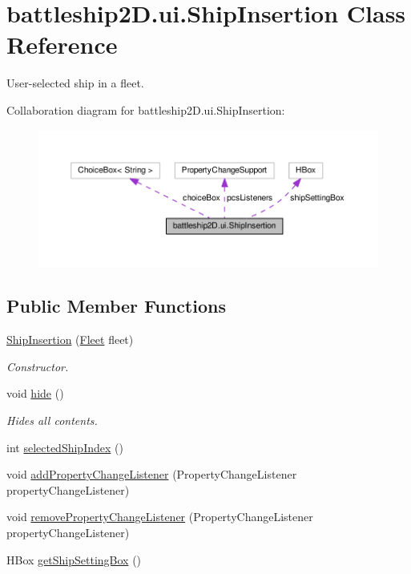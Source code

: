 \hypertarget{classbattleship2D_1_1ui_1_1ShipInsertion}{\section{battleship2\-D.\-ui.\-Ship\-Insertion Class Reference}
\label{classbattleship2D_1_1ui_1_1ShipInsertion}
}


User-\/selected ship in a fleet.  




Collaboration diagram for battleship2\-D.\-ui.\-Ship\-Insertion\-:\nopagebreak
\begin{figure}[H]
\begin{center}
\leavevmode
\includegraphics[width=350pt]{classbattleship2D_1_1ui_1_1ShipInsertion__coll__graph}
\end{center}
\end{figure}
\subsection*{Public Member Functions}
\begin{DoxyCompactItemize}
\item 
\hyperlink{classbattleship2D_1_1ui_1_1ShipInsertion_a834d63089b081bcbf9f1952e7d6de4eb}{Ship\-Insertion} (\hyperlink{classbattleship2D_1_1model_1_1Fleet}{Fleet} fleet)
\begin{DoxyCompactList}\small\item\em Constructor. \end{DoxyCompactList}\item 
void \hyperlink{classbattleship2D_1_1ui_1_1ShipInsertion_a50ceb5ee8c60826eeb3bbb581e692f6e}{hide} ()
\begin{DoxyCompactList}\small\item\em Hides all contents. \end{DoxyCompactList}\item 
int \hyperlink{classbattleship2D_1_1ui_1_1ShipInsertion_a7c9aefda6fac391cdaf8838e42dd9bbd}{selected\-Ship\-Index} ()
\item 
void \hyperlink{classbattleship2D_1_1ui_1_1ShipInsertion_a8148d99472f54b7f349ee72633907182}{add\-Property\-Change\-Listener} (Property\-Change\-Listener property\-Change\-Listener)
\item 
void \hyperlink{classbattleship2D_1_1ui_1_1ShipInsertion_a3f5e0b51699d658b0bbd70655ab885de}{remove\-Property\-Change\-Listener} (Property\-Change\-Listener property\-Change\-Listener)
\item 
H\-Box \hyperlink{classbattleship2D_1_1ui_1_1ShipInsertion_a60e021e03220641d5dd1cf596af70c08}{get\-Ship\-Setting\-Box} ()
\end{DoxyCompactItemize}
